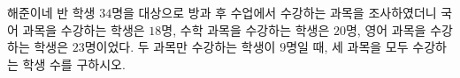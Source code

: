 해준이네 반 학생 $34$명을 대상으로 방과 후 수업에서 수강하는 과목을 조사하였더니 국어 과목을 수강하는 학생은 $18$명, 수학 과목을 수강하는 학생은 $20$명, 영어 과목을 수강하는 학생은 $23$명이었다. 두 과목만 수강하는 학생이 $9$명일 때, 세 과목을 모두 수강하는 학생 수를 구하시오. 
